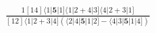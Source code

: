 \documentclass[varwidth, border=5pt]{standalone}
\begin{document}
\begin{my}
$\begin{gathered}
\scriptscriptstyle\frac{1[14]⟨1|𝟓|1]⟨1|2+4|3]⟨4|2+3|1]}{[12]⟨1|2+3|4](⟨2|4|𝟓|1|2]-⟨4|3|𝟓|1|4])}
\end{gathered}$
\end{my}
\end{document}
